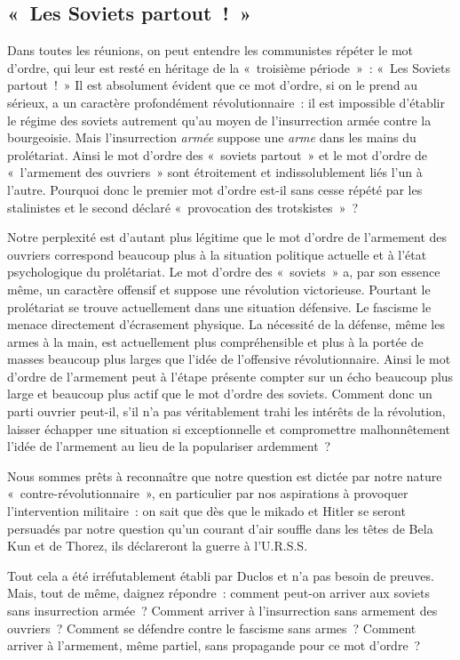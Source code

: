 \documentclass[french,twoside]{book} %
\begin{document}
\subsection[{« Les Soviets partout ! »}]{« Les Soviets partout ! »}
\noindent Dans toutes les réunions, on peut entendre les communistes répéter le mot d’ordre, qui leur est resté en héritage de la « troisième période » : « Les Soviets partout ! » Il est absolument évident que ce mot d’ordre, si on le prend au sérieux, a un caractère profondément révolutionnaire : il est impossible d’établir le régime des soviets autrement qu’au moyen de l’insurrection armée contre la bourgeoisie. Mais l’insurrection \emph{armée} suppose une \emph{arme} dans les mains du prolétariat. Ainsi le mot d’ordre des « soviets partout » et le mot d’ordre de « l’armement des ouvriers » sont étroitement et indissolublement liés l’un à l’autre. Pourquoi donc le premier mot d’ordre est-il sans cesse répété par les stalinistes et le second déclaré « provocation des trotskistes » ?\par
 Notre perplexité est d’autant plus légitime que le mot d’ordre de l’armement des ouvriers correspond beaucoup plus à la situation politique actuelle et à l’état psychologique du prolétariat. Le mot d’ordre des « soviets » a, par son essence même, un caractère offensif et suppose une révolution victorieuse. Pourtant le prolétariat se trouve actuellement dans une situation défensive. Le fascisme le menace directement d’écrasement physique. La nécessité de la défense, même les armes à la main, est actuellement plus compréhensible et plus à la portée de masses beaucoup plus larges que l’idée de l’offensive révolutionnaire. Ainsi le mot d’ordre de l’armement peut à l’étape présente compter sur un écho beaucoup plus large et beaucoup plus actif que le mot d’ordre des soviets. Comment donc un parti ouvrier peut-il, s’il n’a pas véritablement trahi les intérêts de la révolution, laisser échapper une situation si exceptionnelle et compromettre malhonnêtement l’idée de l’armement au lieu de la populariser ardemment ?\par
Nous sommes prêts à reconnaître que notre question est dictée par notre nature « contre-révolutionnaire », en particulier par nos aspirations à provoquer l’intervention militaire : on sait que dès que le mikado et Hitler se seront persuadés par notre question qu’un courant d’air souffle dans les têtes de Bela Kun et de Thorez, ils déclareront la guerre à l’U.R.S.S.\par
Tout cela a été irréfutablement établi par Duclos et n’a pas besoin de preuves. Mais, tout de même, daignez répondre : comment peut-on arriver aux soviets sans insurrection armée ? Comment arriver à l’insurrection sans armement des ouvriers ? Comment se défendre contre le fascisme sans armes ? Comment arriver à l’armement, même partiel, sans propagande pour ce mot d’ordre ?
\end{document}
